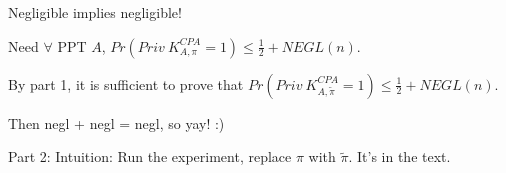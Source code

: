 \documentclass[11pt]{article}
\newcommand{\pit}{\widetilde{\pi}}
\begin{document}
Negligible implies negligible!

Need $\forall$ PPT $A$, $Pr(Priv\ K_{A,\pi}^{CPA}=1)\leq\frac{1}{2}+NEGL(n)$.

By part 1, it is sufficient to prove that $Pr(Priv\ K_{A,\widetilde{\pi}}^{CPA}=1)\leq\frac{1}{2}+NEGL(n)$.

Then negl + negl = negl, so yay! :)

Part 2: Intuition: Run the experiment, replace $\pi$ with $\pit$. It's in the text.
\end{document}
